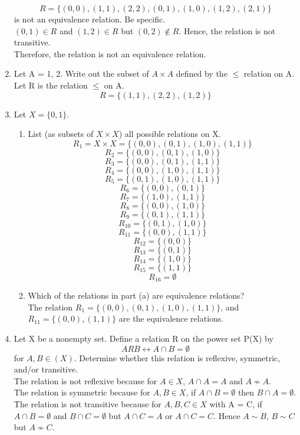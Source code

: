 \documentclass[12pt]{article}
\begin{document}
\begin{enumerate}
  \[R = \{(0,0),(1,1),(2,2),(0,1),(1,0),(1,2),(2,1)\}\]
  is not an equivalence relation. Be specific.\\
  $(0,1) \in R$ and $(1,2) \in R$ but $(0,2) \not\in R$. Hence, the relation is not transitive.\\
  Therefore, the relation is not an equivalence relation.
  \item Let A = {1, 2}. Write out the subset of $A \times A$ defined by the $\leq$ relation on A.\\
  Let R is the relation $\leq$ on A.
  \[R = \{(1,1),(2,2),(1,2)\}\]
  \item Let $X = \{0,1\}$.
  \begin{enumerate}
    \item List (as subsets of $X \times X$) all possible relations on X.
        \[R_1 = X \times X = \{(0,0),(0,1),(1,0),(1,1)\}\]
        \[R_2 = \{(0,0),(0,1),(1,0)\}\]
        \[R_3 = \{(0,0),(0,1),(1,1)\}\]
        \[R_4 = \{(0,0),(1,0),(1,1)\}\]
        \[R_5 = \{(0,1),(1,0),(1,1)\}\]
        \[R_6 = \{(0,0),(0,1)\}\]
        \[R_7 = \{(1,0),(1,1)\}\]
        \[R_8 = \{(0,0),(1,0)\}\]
        \[R_9 = \{(0,1),(1,1)\}\]
        \[R_{10} = \{(0,1),(1,0)\}\]
        \[R_{11} = \{(0,0),(1,1)\}\]
        \[R_{12} = \{(0,0)\}\]
        \[R_{13} = \{(0,1)\}\]
        \[R_{14} = \{(1,0)\}\]
        \[R_{15} = \{(1,1)\}\]
        \[R_{16} = \emptyset\]
    \item Which of the relations in part (a) are equivalence relations?\\
    The relation $R_1 = \{(0,0),(0,1),(1,0),(1,1)\}$, and $R_{11} = \{(0,0),(1,1)\}$ are the equivalence relations.
  \end{enumerate}
  \item Let X be a nonempty set. Define a relation R on the power set P(X) by
  \[ARB \leftrightarrow A\cap B = \emptyset\]
  for $A, B \in (X)$. Determine whether this relation is reflexive, symmetric, and/or transitive.\\
  The relation is not reflexive because for $A \in X$, $A \cap A = A$ and $A \not\sim A$. \\
  The relation is symmetric because for $A,B \in X$, if $A \cap B = \emptyset$ then $B \cap A = \emptyset$.\\
  The relation is not transitive because for $A,B,C \in X$ with A = C, if $A \cap B = \emptyset$ and $B \cap C = \emptyset$ but $A \cap C = A \text{ or } A \cap C = C$. Hence $A \sim B$, $B\sim C$ but $A \not\sim C$.


\end{enumerate}
\end{document}
